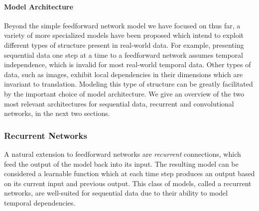 \paragraph{Model Architecture}

Beyond the simple feedforward network model we have focused on thus far, a variety of more specialized models have been proposed which intend to exploit different types of structure present in real-world data.
For example, presenting sequential data one step at a time to a feedforward network assumes temporal independence, which is invalid for most real-world temporal data.
Other types of data, such as images, exhibit local dependencies in their dimensions which are invariant to translation.
Modeling this type of structure can be greatly facilitated by the important choice of model architecture.
We give an overview of the two most relevant architectures for sequential data, recurrent and convolutional networks, in the next two sections.

\subsubsection{Recurrent Networks}

A natural extension to feedforward networks are {\em recurrent} connections, which feed the output of the model back into its input.
The resulting model can be considered a learnable function which at each time step produces an output based on its current input and previous output.
This class of models, called a recurrent networks, are well-suited for sequential data due to their ability to model temporal dependencies.

